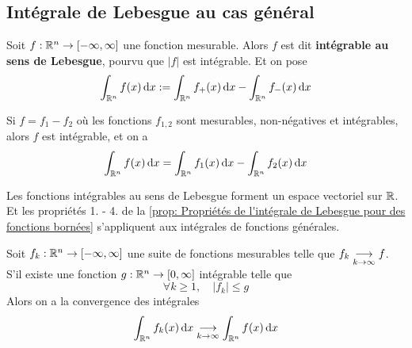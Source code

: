 

\subsection{Intégrale de Lebesgue au cas général}

\begin{definition}
	Soit $f : \mathbb{R}^n \to [-\infty, \infty]$ une fonction mesurable. Alors $f$ est dit \textbf{intégrable au sens de Lebesgue}, pourvu que $|f|$ est intégrable. Et on pose
	\[
	\int_{\mathbb{R}^n} f(x) \, \mathrm dx := \int_{\mathbb{R}^n} f_+(x) \, \mathrm dx - \int_{\mathbb{R}^n} f_-(x) \, \mathrm dx 
	\]
\end{definition}

\begin{lemme}
	Si $f = f_1 - f_2$ où les fonctions $f_{1,2}$ sont mesurables, non-négatives et intégrables, alors $f$ est intégrable, et on a
	\[
	\int_{\mathbb{R}^n} f(x) \, \mathrm dx = \int_{\mathbb{R}^n} f_1(x) \, \mathrm dx - \int_{\mathbb{R}^n} f_2(x) \, \mathrm dx 
	\]
\end{lemme}


\begin{proposition}
	Les fonctions intégrables au sens de Lebesgue forment un espace vectoriel sur $\mathbb{R}$. Et les propriétés 1. - 4. de la \autoref{prop: Propriétés de l'intégrale de Lebesgue pour des fonctions bornées} s'appliquent aux intégrales de fonctions générales.
\end{proposition}

\begin{theoreme} \label{thm: Théorème de convegence dominée}
	Soit $f_k : \mathbb{R}^n \to [-\infty, \infty]$ une suite de fonctions mesurables telle que $f_k \underset{k \to \infty}{\longrightarrow} f$. S'il existe une fonction $g : \mathbb{R}^n \to [0, \infty]$ intégrable telle que
	\[
	\forall k \geqslant 1, \quad |f_k| \leqslant g
	\]
	Alors on a la convergence des intégrales
	\[
	\int_{\mathbb{R}^n} f_k (x) \, \mathrm dx \underset{k \to \infty}{\longrightarrow} \int_{\mathbb{R}^n} f(x) \, \mathrm dx
	\]
\end{theoreme}


